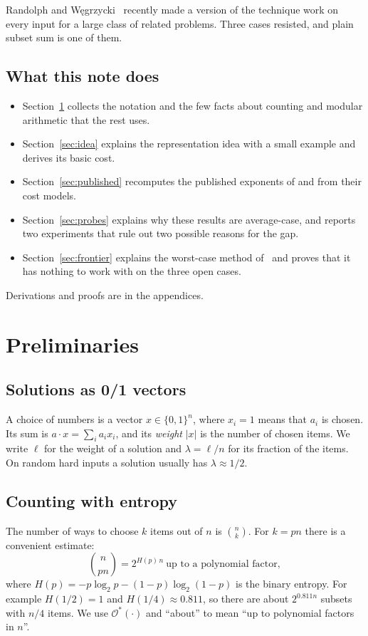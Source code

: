 \documentclass[conference]{IEEEtran}
\newcommand{\Oh}{\mathcal{O}}
\begin{document}
Randolph and W\k{e}grzycki~\cite{rw} recently made a version of the technique
work on every input for a large class of related problems. Three cases resisted,
and plain subset sum is one of them.

\subsection{What this note does}
\begin{itemize}
\item Section~\ref{sec:prelim} collects the notation and the few facts about
counting and modular arithmetic that the rest uses.
\item Section~\ref{sec:idea} explains the representation idea with a small
example and derives its basic cost.
\item Section~\ref{sec:published} recomputes the published exponents of
\cite{hgj} and \cite{bcj} from their cost models.
\item Section~\ref{sec:probes} explains why these results are average-case, and
reports two experiments that rule out two possible reasons for the gap.
\item Section~\ref{sec:frontier} explains the worst-case method of~\cite{rw}
and proves that it has nothing to work with on the three open cases.
\end{itemize}
Derivations and proofs are in the appendices.

\section{Preliminaries}\label{sec:prelim}

\subsection{Solutions as 0/1 vectors}
A choice of numbers is a vector $x\in\{0,1\}^n$, where $x_i=1$ means that $a_i$
is chosen. Its sum is $a\cdot x=\sum_i a_ix_i$, and its \emph{weight} $|x|$ is
the number of chosen items. We write $\ell$ for the weight of a solution and
$\lambda=\ell/n$ for its fraction of the items. On random hard inputs a solution
usually has $\lambda\approx1/2$.

\subsection{Counting with entropy}
The number of ways to choose $k$ items out of $n$ is $\binom{n}{k}$. For
$k=pn$ there is a convenient estimate:
\[
\binom{n}{pn}=2^{H(p)\,n}\ \text{up to a polynomial factor},
\]
where $H(p)=-p\log_2 p-(1-p)\log_2(1-p)$ is the binary entropy. For example
$H(1/2)=1$ and $H(1/4)\approx0.811$, so there are about $2^{0.811n}$ subsets with
$n/4$ items. We use $\Oh^*(\cdot)$ and ``about'' to mean ``up to polynomial
factors in $n$''.
\end{document}
